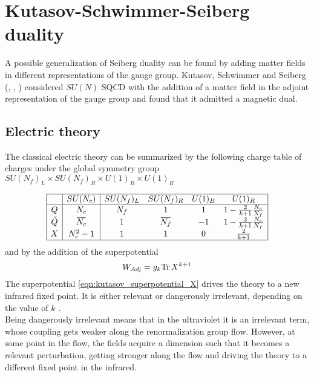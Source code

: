 


\section{Kutasov-Schwimmer-Seiberg duality}
\label{sec:kutasov_duality4d}
A possible generalization of Seiberg duality can be found by adding matter fields in different representations of the gauge group.
Kutasov, Schwimmer and Seiberg (\cite{Kutasov:1995ve}, \cite{Kutasov:1995np}, \cite{Kutasov:1995ss}) considered $SU(N)$ SQCD with the addition of a matter field in the adjoint representation of the gauge group and found that it admitted a magnetic dual.

\subsection{Electric theory }
The classical electric theory can be summarized by the following charge table of charges under the global symmetry group $SU(N_f)_L \times SU(N_f)_R \times U(1)_B \times U(1)_R
$

\begin{equation}
\begin{array}{| c | c | c c c c | }
\hline
 & SU(N_c) &SU(N_f)_L  &SU(N_f)_R   & U(1)_B &  U(1)_R \\
\hline
Q & N_c&N_f& 1   &  1  &  1 - \frac{2}{k+1} \frac{N_c}{N_f}  \\
\tilde{Q} & \overbar{N_c} &  1 & \overbar{ N_f}   & -1   &   1 - \frac{2}{k+1} \frac{N_c}{N_f}    \\
X & N_c^2-1 & 1   & 1    & 0   &  \frac{2}{k+1} \\
\hline
\end{array}
\centering
\label{table:charge_table_el_ks_4d}
\end{equation}
and by the addition of the superpotential
\begin{equation}
	W_{Adj} = g_k \mathrm{Tr } \,{X^{k+1}}
	\label{eqn:kutasov_superpotential_X}
\end{equation}
The superpotential \eqref{eqn:kutasov_superpotential_X} drives the theory to a new infrared fixed point. It is either relevant or dangerously irrelevant, depending on the value of $k$ \cite{Kutasov:1995np}. \\
Being dangerously irrelevant means that in the ultraviolet it is an irrelevant term, whose coupling gets weaker along the renormalization group flow.
However, at some point in the flow, the fields acquire a dimension such that it becomes a relevant perturbation, getting stronger along the flow and driving the theory to a different fixed point in the infrared.

